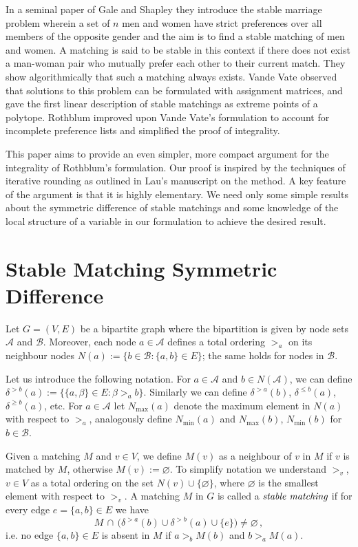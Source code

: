\documentclass[preprint]{elsarticle}
\begin{document}
In a seminal paper of Gale and Shapley \cite{gale1962college} they introduce the stable marriage problem wherein a set of $n$ men and women have strict preferences over all members of the opposite gender and the aim is to find a stable matching of men and women. A matching is said to be stable in this context if there does not exist a man-woman pair who mutually prefer each other to their current match. They show algorithmically that such a matching always exists. Vande Vate \cite{vate1989linear} observed that solutions to this problem can be formulated with assignment matrices, and gave the first linear description of stable matchings as extreme points of a polytope. Rothblum \cite{rothblum1992characterization} improved upon Vande Vate's formulation to account for incomplete preference lists and simplified the proof of integrality.

This paper aims to provide an even simpler, more compact argument for the integrality of Rothblum's formulation. Our proof is inspired by the techniques of iterative rounding as outlined in Lau's \cite{lau2011iterative} manuscript on the method. A key feature of the argument is that it is highly elementary. We need only some simple results about the symmetric difference of stable matchings and some knowledge of the local structure of a variable in our formulation to achieve the desired result.

\section{Stable Matching Symmetric Difference}

Let $G = (V, E)$ be a bipartite graph  where the bipartition is given by node sets $\mathcal{A}$ and $\mathcal{B}$. Moreover, each node $a\in\mathcal{A}$ defines a total ordering $>_a$ on its neighbour nodes $N(a):=\{b \in\mathcal{B}: \{a,b\}\in E\}$;  the same holds for nodes in $\mathcal{B}$.

Let us introduce the following notation. For $a\in \mathcal{A}$ and $b \in N(\mathcal{A})$, we can define $\delta^{>b}(a):=\{ \{a,\beta\}\in E: \beta>_a b \}$. Similarly we can define $\delta^{>a}(b)$, $\delta^{\leq b}(a)$, $\delta^{\geq b}(a)$, etc. For $a\in \mathcal{A}$ let $N_{\max}(a)$ denote the maximum element in $N(a)$ with respect to $>_a$, analogously define $N_{\min}(a)$ and $N_{\max}(b)$, $N_{\min}(b)$ for $b\in\mathcal{B}$. 

Given a matching $M$ and $v\in V$, we define $M(v)$ as a neighbour of $v$ in $M$ if $v$ is matched by $M$, otherwise $M(v):=\varnothing$. To simplify notation we understand $>_v$, $v\in V$ as a total ordering on the set $N(v)\cup\{\varnothing\}$, where $\varnothing$ is the smallest element with respect to $>_v$.
A matching $M$ in $G$ is called a $\emph{stable matching}$ if for every edge $e=\{a,b\}\in E$ we have
\begin{equation}\label{eq:stability_def}
		M \, \cap \, \big(\delta^{>a}(b) \cup \delta^{>b}(a) \cup  \{e\} \big)\neq\varnothing\,,
\end{equation}
i.e. no edge $\{a,b\}\in E$ is absent in $M$  if $a>_b M(b)$ and $b>_a M(a)$.
\end{document}
